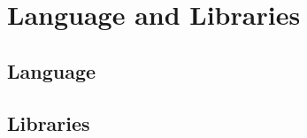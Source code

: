 \chapter{Language and Libraries}
\label{AppendixB}

\section{Language}
\label{sec:language}

\section{Libraries}
\label{sec:libraries}
